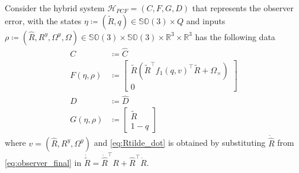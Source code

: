 \documentclass{article}
\newcommand{\dom}{\text{dom }}
\newcommand{\SOthree}{\mathbb{SO}(3)}
\newcommand{\R}[1]{\mathbb{R}^{#1}}
\newcommand{\Omegay}{\Omega^y}
\newcommand{\brackets}[1]{\left(#1\right)}
\newcommand{\textblue}[1]{\textcolor{blue}{#1}}
\newcommand{\Rtilde}{\tilde{R}}
\newcommand{\normSOthree}[1]{{{\vert}#1 {\vert}_I}}
\begin{document}



Consider the hybrid system $\mathcal{H}_{PCF} = (C, F, G, D)$ that represents the observer error, with the states $\eta \coloneqq (\Rtilde, q) \in \SOthree\times Q$ and inputs $\rho \coloneqq (\hat{R}, R^y, \Omegay, \Omega)\in\SOthree\times\SOthree\times \R{3}\times \R{3}$ has the following data
\begin{subequations}\label{eq:hybrid_observer_error}
\begin{align}
C&\coloneqq \hat{C}\\
F(\eta, \rho)&\coloneqq \begin{bmatrix}
    \Rtilde\brackets{\Rtilde^\top f_1(q, v)^\top \Rtilde + \Omega_\times}\\ 0\end{bmatrix} \label{eq:Rtilde_dot}\\
D &\coloneqq \hat{D}\\
G(\eta, \rho) &\coloneqq \begin{bmatrix}
\Rtilde \\ 1 - q
\end{bmatrix}
\end{align}
\end{subequations}
where $v = (\hat{R}, R^y, \Omegay)$ and \eqref{eq:Rtilde_dot} is obtained by substituting $\dot{\hat{R}}$ from \eqref{eq:observer_final} in $\dot{\Rtilde} = \dot{\hat{R}}^\top R + \hat{R}^\top \dot{R}$. 
\end{document}
